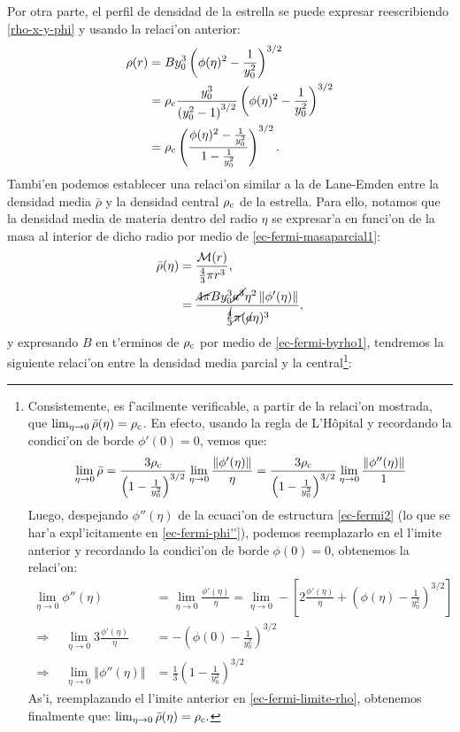 Por otra parte, el perfil de densidad de la estrella se puede expresar reescribiendo \eqref{rho-x-y-phi} y usando la relaci'on anterior:
\begin{align}
 \rho(r)&=By_0^3\left(\phi(\eta)^2-\frac{1}{y_0^2}\right)^{3/2}\label{ec-fermi-dens}\\
&=\rho_{\rm c}\frac{y_0^3}{\left(y_0^2-1\right)^{3/2}}\left(\phi(\eta)^2-\frac{1}{y_0^2}\right)^{3/2}\\
&=\rho_{\rm c}\left(\frac{\phi(\eta)^2-\frac{1}{y_0^2}}{1-\frac{1}{y_0^2}}\right)^{3/2}.
\end{align}
Tambi'en podemos establecer una relaci'on similar a la de Lane-Emden entre la densidad media $\bar{\rho}$ y la densidad central $\rho_{\rm c}$ de la estrella. Para ello, notamos que la densidad media de materia dentro del radio $\eta$ se expresar'a en funci'on de la masa al interior de dicho radio por medio de \eqref{ec-fermi-masaparcial1}:
\begin{align}
 \bar{\rho}(\eta)&=\frac{\mathcal{M}(r)}{\frac{4}{3}\pi r^3},\\
&=\frac{\cancel{4\pi} B y_0^3 \cancel{a^3}\eta^2\left\Vert\phi'(\eta)\right\Vert}{\frac{\cancel{4}}{3}\cancel{\pi} (\cancel{a}\eta)^3},
\end{align}
y expresando $B$ en t'erminos de $\rho_{\rm c}$ por medio de \eqref{ec-fermi-byrho1}, tendremos la siguiente relaci'on entre la densidad media parcial y la central\footnote{Consistemente, es f'acilmente verificable, a partir de la relaci'on mostrada, que $\lim_{\eta\to 0}\bar{\rho}(\eta)=\rho_{\rm c}$. En efecto, usando la regla de L'H\^opital y recordando la condici'on de borde $\phi'(0)=0$, vemos que:
\begin{align}
\lim_{\eta\to 0}\bar{\rho}=\frac{3\rho_{\rm c}}{\left(1-\frac{1}{y_0^2}\right)^{3/2}}\lim_{\eta\to 0}\frac{\left\Vert\phi'(\eta)\right\Vert}{\eta}
=
\frac{3\rho_{\rm c}}{\left(1-\frac{1}{y_0^2}\right)^{3/2}}\lim_{\eta\to 0}\frac{\left\Vert\phi''(\eta)\right\Vert}{1}\label{ec-fermi-limite-rho}
\end{align}
Luego, despejando $\phi''(\eta)$ de la ecuaci'on de estructura \eqref{ec-fermi2} (lo que se har'a expl'icitamente en \eqref{ec-fermi-phi''}), podemos reemplazarlo en el l'imite anterior y recordando la condici'on de borde $\phi(0)=0$, obtenemos la relaci'on:
\begin{align}
\lim_{\eta\to 0}\phi''(\eta)&=\lim_{\eta\to 0}\frac{\phi'(\eta)}{\eta}=\lim_{\eta\to 0}-\left[2\frac{\phi'(\eta)}{\eta}+\left(\phi(\eta)-\frac{1}{y_0^2}\right)^{3/2}\right]\\
\Rightarrow\quad\lim_{\eta\to 0}3\frac{\phi'(\eta)}{\eta}&=-\left(\phi(0)-\frac{1}{y_0^2}\right)^{3/2}\\
\Rightarrow\quad\lim_{\eta\to 0}\left\Vert\phi''(\eta)\right\Vert&=\frac{1}{3}\left(1-\frac{1}{y_0^2}\right)^{3/2}
\end{align}
As'i, reemplazando el l'imite anterior en \eqref{ec-fermi-limite-rho}, obtenemos finalmente que:
$\lim_{\eta\to 0}\bar{\rho}(\eta)=\rho_{\rm c}.$
}:
